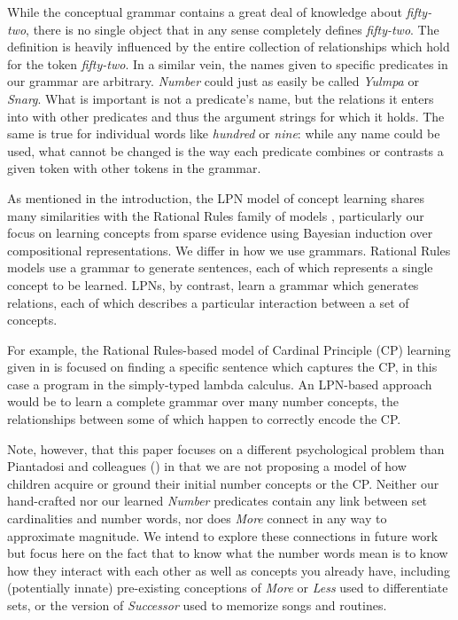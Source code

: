 \documentclass[10pt,letterpaper]{article}
\begin{document}

While the conceptual grammar contains a great deal of knowledge about
\emph{fifty-two}, there is no single object that in any sense
completely defines \emph{fifty-two}. The definition is heavily
influenced by the entire collection of relationships which hold for
the token \emph{fifty-two}. In a similar vein, the names given to
specific predicates in our grammar are arbitrary. \emph{Number} could
just as easily be called \emph{Yulmpa} or \emph{Snarg}. What is
important is not a predicate's name, but the relations it enters into
with other predicates and thus the argument strings for which it
holds. The same is true for individual words like \emph{hundred} or
\emph{nine}: while any name could be used, what cannot be changed is
the way each predicate combines or contrasts a given token with other
tokens in the grammar.

As mentioned in the introduction, the LPN model of concept learning
shares many similarities with the Rational Rules family of models
\citep{goodman2008rational,T.D.Ullman:2012:1b1b6,PianGoodTen2012},
particularly our focus on learning concepts from sparse evidence using
Bayesian induction over compositional representations. We differ in
how we use grammars. Rational Rules models use a grammar to generate
sentences, each of which represents a single concept to be learned.
LPNs, by contrast, learn a grammar which generates relations, each of
which describes a particular interaction between a set of concepts.

For example, the Rational Rules-based model of Cardinal Principle (CP)
learning given in \citep{PianGoodTen2012} is focused on finding a
specific sentence which captures the CP, in this case a program in the
simply-typed lambda calculus. An LPN-based approach would be to learn
a complete grammar over many number concepts, the relationships
between some of which happen to correctly encode the CP.

Note, however, that this paper focuses on a different psychological
problem than Piantadosi and colleagues (\citeyear{PianGoodTen2012}) in
that we are not proposing a model of how children acquire or ground
their initial number concepts or the CP. Neither our hand-crafted nor
our learned \emph{Number} predicates contain any link between set
cardinalities and number words, nor does \emph{More} connect in any
way to approximate magnitude. We intend to explore these connections
in future work but focus here on the fact that to know what the number
words mean is to know how they interact with each other as well as
concepts you already have, including (potentially innate) pre-existing
conceptions of \emph{More} or \emph{Less} used to differentiate sets,
or the version of \emph{Successor} used to memorize songs and
routines.
\end{document}

